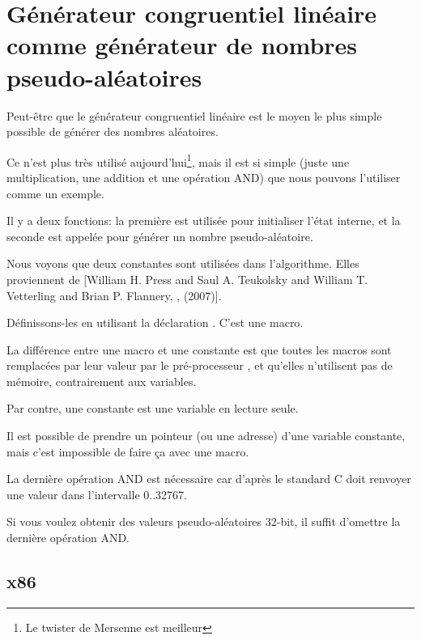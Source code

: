 \section[Générateur congruentiel linéaire]{Générateur congruentiel linéaire comme générateur de nombres pseudo-aléatoires}
\label{LCG_simple}

Peut-être que le générateur congruentiel linéaire est le moyen le plus simple possible
de générer des nombres aléatoires.

Ce n'est plus très utilisé aujourd'hui\footnote{Le twister de Mersenne est meilleur},
mais il est si simple (juste une multiplication, une addition et une opération AND)
que nous pouvons l'utiliser comme un exemple.



Il y a deux fonctions: la première est utilisée pour initialiser l'état interne,
et la seconde est appelée pour générer un nombre pseudo-aléatoire.

Nous voyons que deux constantes sont utilisées dans l'algorithme.
Elles proviennent de
[William H. Press and Saul A. Teukolsky and William T. Vetterling and Brian P. Flannery, , (2007)].

Définissons-les en utilisant la déclaration \CCpp {}. C'est une macro.

La différence entre une macro \CCpp et une constante est que toutes les macros sont
remplacées par leur valeur par le pré-processeur \CCpp, et qu'elles n'utilisent pas
de mémoire, contrairement aux variables.

Par contre, une constante est une variable en lecture seule.

Il est possible de prendre un pointeur (ou une adresse) d'une variable constante,
mais c'est impossible de faire ça avec une macro.

La dernière opération AND est nécessaire car d'après le standard C 
doit renvoyer une valeur dans l'intervalle 0..32767.

Si vous voulez obtenir des valeurs pseudo-aléatoires 32-bit, il suffit d'omettre
la dernière opération AND.

\subsection{x86}



